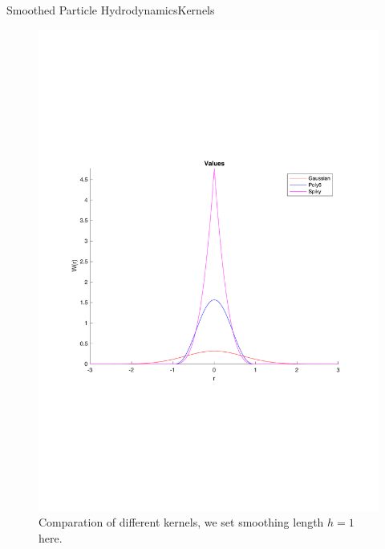 \documentclass{beamer}
\begin{document}
\begin{frame}{Smoothed Particle Hydrodynamics}{Kernels}
\begin{figure}
        \centering
        \includegraphics[scale = 0.3]{../report/Figures/kernels}
        \caption{Comparation of different kernels, we set smoothing length $h = 1$ here.}
\end{figure}
\end{frame}
\end{document}
